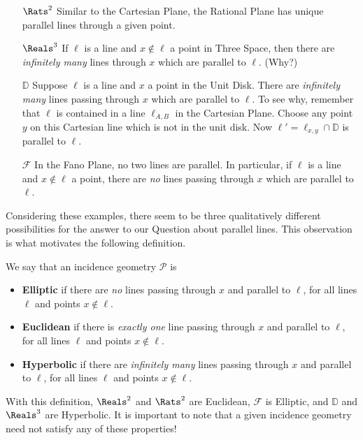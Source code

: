 \documentclass{article}
\begin{document}
\begin{itemize}
\item[$\Rats^2$] Similar to the Cartesian Plane, the Rational Plane has unique parallel lines through a given point.

\item[$\Reals^3$] If $\ell$ is a line and $x \notin \ell$ a point in Three Space, then there are \emph{infinitely many} lines through $x$ which are parallel to $\ell$. (Why?)

\item[$\mathbb{D}$] Suppose $\ell$ is a line and $x$ a point in the Unit Disk. There are \emph{infinitely many} lines passing through $x$ which are parallel to $\ell$. To see why, remember that $\ell$ is contained in a line $\ell_{A,B}$ in the Cartesian Plane. Choose any point $y$ on this Cartesian line which is not in the unit disk. Now $\ell' = \ell_{x,y} \cap \mathbb{D}$ is parallel to $\ell$.

\item[$\mathcal{F}$] In the Fano Plane, no two lines are parallel. In particular, if $\ell$ is a line and $x \notin \ell$ a point, there are \emph{no} lines passing through $x$ which are parallel to $\ell$.
\end{itemize}

Considering these examples, there seem to be three qualitatively different possibilities for the answer to our Question about parallel lines. This observation is what motivates the following definition.

\begin{dfn}
We say that an incidence geometry $\mathcal{P}$ is
\begin{itemize}
\item \textbf{Elliptic} if there are \emph{no} lines passing through $x$ and parallel to $\ell$, for all lines $\ell$ and points $x \notin \ell$.
\item \textbf{Euclidean} if there is \emph{exactly one} line passing through $x$ and parallel to $\ell$, for all lines $\ell$ and points $x \notin \ell$.
\item \textbf{Hyperbolic} if there are \emph{infinitely many} lines passing through $x$ and parallel to $\ell$, for all lines $\ell$ and points $x \notin \ell$.
\end{itemize}
\end{dfn}

With this definition, $\Reals^2$ and $\Rats^2$ are Euclidean, $\mathcal{F}$ is Elliptic, and $\mathbb{D}$ and $\Reals^3$ are Hyperbolic. It is important to note that a given incidence geometry need not satisfy any of these properties!
\end{document}
